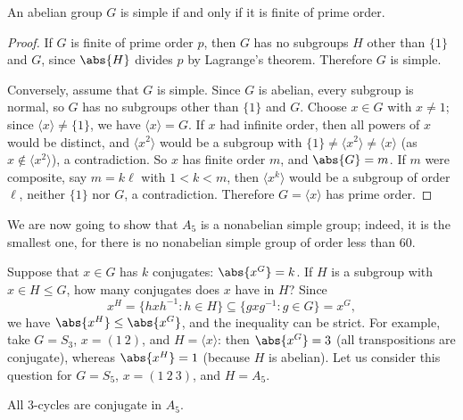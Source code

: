 \begin{proposition}\label{prop:abelian-simple}
	An abelian group \(G\) is simple if and only if it is finite of prime order.
\end{proposition}

\begin{proof}
	If \(G\) is finite of prime order \(p\), then \(G\) has no subgroups \(H\) other than
	\(\{1\}\) and \(G\), since \(\abs{H}\) divides \(p\) by Lagrange's theorem. Therefore
	\(G\) is simple.

	Conversely, assume that \(G\) is simple. Since \(G\) is abelian, every subgroup is
	normal, so \(G\) has no subgroups other than \(\{1\}\) and \(G\). Choose \(x \in G\)
	with \(x \neq 1\); since \(\langle x\rangle \neq \{1\}\), we have
	\(\langle x\rangle = G\). If \(x\) had infinite order, then all powers of \(x\) would be
	distinct, and \(\langle x^2\rangle\) would be a subgroup with
	\(\{1\} \neq \langle x^2\rangle \neq \langle x\rangle\) (as \(x \notin \langle x^2\rangle\)), a
	contradiction. So \(x\) has finite order \(m\), and \(\abs{G} = m\). If \(m\) were
	composite, say \(m = k\ell\) with \(1 < k < m\), then \(\langle x^k\rangle\) would be a
	subgroup of order \(\ell\), neither \(\{1\}\) nor \(G\), a contradiction. Therefore
	\(G = \langle x\rangle\) has prime order.
\end{proof}

We are now going to show that \(A_5\) is a nonabelian simple group; indeed, it is the
smallest one, for there is no nonabelian simple group of order less than \(60\).

Suppose that \(x \in G\) has \(k\) conjugates: \(\abs{x^G} = k\). If \(H\) is a subgroup
with \(x \in H \leq G\), how many conjugates does \(x\) have in \(H\)? Since
\[
	x^H = \{hxh^{-1} : h \in H\} \subseteq \{gxg^{-1} : g \in G\} = x^G,
\]
we have \(\abs{x^H} \leq \abs{x^G}\), and the inequality can be strict. For example, take
\(G = S_3\), \(x = (1\ 2)\), and \(H = \langle x\rangle\): then \(\abs{x^G} = 3\) (all
transpositions are conjugate), whereas \(\abs{x^H} = 1\) (because \(H\) is abelian). Let us
consider this question for \(G = S_5\), \(x = (1\ 2\ 3)\), and \(H = A_5\).

\begin{lemma}\label{lem:A5-3-cycles-conjugate}
	All \(3\)-cycles are conjugate in \(A_5\).
\end{lemma}

